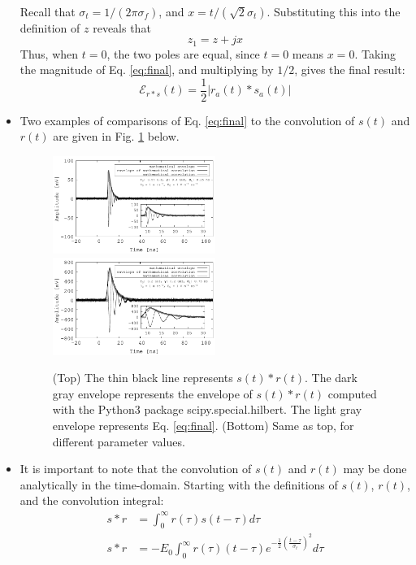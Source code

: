 \documentclass[amsmath,amssymb,aps,prd,10pt,twocolumn,showkeys]{revtex4}
\begin{document}
\begin{itemize}
\begin{align}
\end{align}
Recall that $\sigma_t = 1/(2\pi \sigma_f)$, and $x=t/(\sqrt{2}\sigma_t)$.  Substituting this into the definition of $z$ reveals that
\begin{equation}
z_1 = z + jx
\end{equation}
Thus, when $t=0$, the two poles are equal, since $t=0$ means $x=0$.  Taking the magnitude of Eq. \ref{eq:final}, and multiplying by $1/2$, gives the final result:
\begin{equation}
\mathcal{E}_{r * s}(t) = \frac{1}{2} | r_a(t) * s_a(t) |
\end{equation}
\item Two examples of comparisons of Eq. \ref{eq:final} to the convolution of $s(t)$ and $r(t)$ are given in Fig. \ref{fig:fig1} below.
\begin{figure}[hb]
\centering
\includegraphics[width=0.5\textwidth]{March12_plot1.pdf}
\includegraphics[width=0.5\textwidth]{March12_plot2.pdf}
\caption{\label{fig:fig1} (Top) The thin black line represents $s(t) * r(t)$.  The dark gray envelope represents the envelope of $s(t) * r(t)$ computed with the Python3 package scipy.special.hilbert. The light gray envelope represents Eq. \ref{eq:final}. (Bottom) Same as top, for different parameter values.}
\end{figure}
\item It is important to note that the convolution of $s(t)$ and $r(t)$ may be done analytically in the time-domain.  Starting with the definitions of $s(t)$, $r(t)$, and the convolution integral:
\begin{align}
s * r &= \int_0^{\infty} r(\tau) s(t-\tau) d\tau \\
s * r &= -E_0 \int_0^{\infty} r(\tau) (t-\tau) e^{-\frac{1}{2}\left(\frac{t-\tau}{\sigma_t}\right)^2}d\tau \\

\end{align}
\end{itemize}
\end{document}

